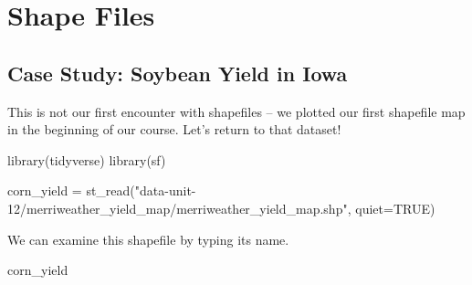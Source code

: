 \documentclass[
]{book}
\newenvironment{Shaded}{\begin{snugshade}}{\end{snugshade}}
\newcommand{\AttributeTok}[1]{\textcolor[rgb]{0.77,0.63,0.00}{#1}}
\newcommand{\ConstantTok}[1]{\textcolor[rgb]{0.00,0.00,0.00}{#1}}
\newcommand{\FunctionTok}[1]{\textcolor[rgb]{0.00,0.00,0.00}{#1}}
\newcommand{\NormalTok}[1]{#1}
\newcommand{\OtherTok}[1]{\textcolor[rgb]{0.56,0.35,0.01}{#1}}
\newcommand{\StringTok}[1]{\textcolor[rgb]{0.31,0.60,0.02}{#1}}
\begin{document}
\hypertarget{shape-files}{%
\section{Shape Files}\label{shape-files}}

\hypertarget{case-study-soybean-yield-in-iowa}{%
\subsection{Case Study: Soybean Yield in Iowa}\label{case-study-soybean-yield-in-iowa}}

This is not our first encounter with shapefiles -- we plotted our first shapefile map in the beginning of our course. Let's return to that dataset!

\begin{Shaded}
\begin{Highlighting}[]
\FunctionTok{library}\NormalTok{(tidyverse)}
\FunctionTok{library}\NormalTok{(sf)}

\NormalTok{corn\_yield }\OtherTok{=} \FunctionTok{st\_read}\NormalTok{(}\StringTok{"data{-}unit{-}12/merriweather\_yield\_map/merriweather\_yield\_map.shp"}\NormalTok{, }\AttributeTok{quiet=}\ConstantTok{TRUE}\NormalTok{)}
\end{Highlighting}
\end{Shaded}

We can examine this shapefile by typing its name.

\begin{Shaded}
\begin{Highlighting}[]
\NormalTok{corn\_yield}
\end{Highlighting}
\end{Shaded}
\end{document}
